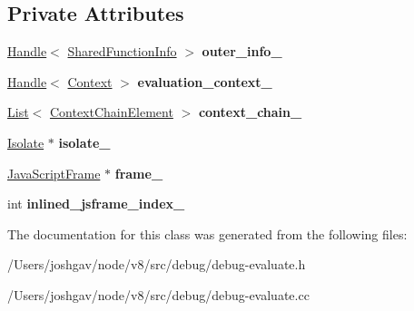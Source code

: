 \subsection*{Private Attributes}
\begin{DoxyCompactItemize}
\item 
\hyperlink{classv8_1_1internal_1_1_handle}{Handle}$<$ \hyperlink{classv8_1_1internal_1_1_shared_function_info}{Shared\+Function\+Info} $>$ {\bfseries outer\+\_\+info\+\_\+}\hypertarget{classv8_1_1internal_1_1_debug_evaluate_1_1_context_builder_a0d3c048c7279e0ae8d867b485b65a7ab}{}\label{classv8_1_1internal_1_1_debug_evaluate_1_1_context_builder_a0d3c048c7279e0ae8d867b485b65a7ab}

\item 
\hyperlink{classv8_1_1internal_1_1_handle}{Handle}$<$ \hyperlink{classv8_1_1internal_1_1_context}{Context} $>$ {\bfseries evaluation\+\_\+context\+\_\+}\hypertarget{classv8_1_1internal_1_1_debug_evaluate_1_1_context_builder_a08602424bda1a4939652e59382ab1f17}{}\label{classv8_1_1internal_1_1_debug_evaluate_1_1_context_builder_a08602424bda1a4939652e59382ab1f17}

\item 
\hyperlink{classv8_1_1internal_1_1_list}{List}$<$ \hyperlink{structv8_1_1internal_1_1_debug_evaluate_1_1_context_builder_1_1_context_chain_element}{Context\+Chain\+Element} $>$ {\bfseries context\+\_\+chain\+\_\+}\hypertarget{classv8_1_1internal_1_1_debug_evaluate_1_1_context_builder_a0e2da38e9a913206712b6b5dace5882b}{}\label{classv8_1_1internal_1_1_debug_evaluate_1_1_context_builder_a0e2da38e9a913206712b6b5dace5882b}

\item 
\hyperlink{classv8_1_1internal_1_1_isolate}{Isolate} $\ast$ {\bfseries isolate\+\_\+}\hypertarget{classv8_1_1internal_1_1_debug_evaluate_1_1_context_builder_a3700642b7fd041a5e8bd1186053b04cd}{}\label{classv8_1_1internal_1_1_debug_evaluate_1_1_context_builder_a3700642b7fd041a5e8bd1186053b04cd}

\item 
\hyperlink{classv8_1_1internal_1_1_java_script_frame}{Java\+Script\+Frame} $\ast$ {\bfseries frame\+\_\+}\hypertarget{classv8_1_1internal_1_1_debug_evaluate_1_1_context_builder_a2c8f85a34a4242f842b8c89f991fdd1d}{}\label{classv8_1_1internal_1_1_debug_evaluate_1_1_context_builder_a2c8f85a34a4242f842b8c89f991fdd1d}

\item 
int {\bfseries inlined\+\_\+jsframe\+\_\+index\+\_\+}\hypertarget{classv8_1_1internal_1_1_debug_evaluate_1_1_context_builder_a59c32d4679d8d679d95ccfda03fdde91}{}\label{classv8_1_1internal_1_1_debug_evaluate_1_1_context_builder_a59c32d4679d8d679d95ccfda03fdde91}

\end{DoxyCompactItemize}


The documentation for this class was generated from the following files\+:\begin{DoxyCompactItemize}
\item 
/\+Users/joshgav/node/v8/src/debug/debug-\/evaluate.\+h\item 
/\+Users/joshgav/node/v8/src/debug/debug-\/evaluate.\+cc\end{DoxyCompactItemize}
